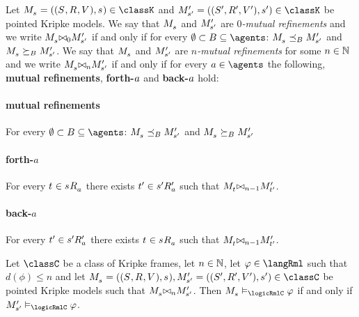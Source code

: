 \begin{definition}
Let $\kPModelAndTuple{\kStateS} \in \classK$ and $\kPModelAndTupleP{\kStateSP} \in \classK$ be pointed Kripke models.
We say that $\kPModel{\kStateS}$ and ${M^{\prime}_{{s}^{\prime}}}$ are {\em $0$-mutual refinements}
and we write $\kPModel{\kStateS} \bisimref[0] \kPModelP{\kStateSP}$
if and only if for every $\emptyset \subset \agentsB \subseteq \agents$: 
$\kPModel{\kStateS} \refinesBs \kPModelP{\kStateSP}$ 
and $\kPModel{\kStateS} \simulatesBs \kPModelP{\kStateSP}$.
We say that $\kPModel{\kStateS}$ and ${M^{\prime}_{{s}^{\prime}}}$ are {\em $n$-mutual refinements}
for some $n \in \mathbb{N}$
and we write $\kPModel{\kStateS} \bisimref[n] \kPModelP{\kStateSP}$
if and only if for every $\agentA \in \agents$
the following, {\bf mutual refinements}, {\bf forth-$a$} and {\bf back-$a$} hold:

\paragraph{mutual refinements} 
For every $\emptyset \subset \agentsB \subseteq \agents$:
$\kPModel{\kStateS} \refinesBs \kPModelP{\kStateSP}$ 
and $\kPModel{\kStateS} \simulatesBs \kPModelP{\kStateSP}$ 

\paragraph{forth-$a$} For every $\kStateT \in \kStateS \kAccessibility{\agentA}$ 
there exists ${t}^{\prime} \in {s}^{\prime} {R^{\prime}_{a}}$
such that $\kPModel{\kStateT} \bisimref[n-1] \kPModelP{\kStateTP}$.

\paragraph{back-$a$} For every ${t}^{\prime} \in {s}^{\prime} {R^{\prime}_{a}}$
there exists $\kStateT \in \kStateS \kAccessibility{\agentA}$ 
such that $\kPModel{\kStateT} \bisimref[n-1] \kPModelP{\kStateTP}$.
\end{definition}

\begin{lemma}
Let $\classC$ be a class of Kripke frames,
let $n \in \mathbb{N}$,
let $\phi \in \langRml$ such that $d(\phi) \leq n$
and let $\kPModelAndTuple{\kStateS}, \kPModelAndTupleP{\kStateSP} \in \classC$ be pointed Kripke models
such that $\kPModel{\kStateS} \bisimref[n] \kPModelP{\kStateSP}$.
Then $\kPModel{\kStateS} \entails_\logicRmlC \phi$ if and only if $\kPModelP{\kStateSP} \entails_\logicRmlC \phi$.
\end{lemma}

